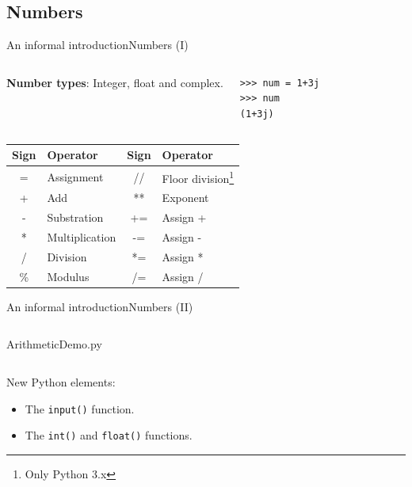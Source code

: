 \documentclass[10pt,compress]{beamer} %
\begin{document}
\subsection{Numbers}
\begin{frame}[fragile]{An informal introduction}{Numbers (I)}

\vspace{-0.2cm}
	\begin{columns}
	\textbf{Number types}: Integer, float and complex.

				\begin{block}{}
\begin{verbatim}
>>> num = 1+3j
>>> num
(1+3j)
\end{verbatim}
		\end{block}
		\end{columns}

    \vspace{-0.2cm}
	\begin{center}
	\bigskip
		\centering \begin{tabular}{cl|cl}\hline
		\sc Sign & \sc Operator 	& \sc Sign 	& \sc Operator \\ \hline
		= 	 & Assignment   & // 	& Floor division\footnote{Only Python 3.x}\\
		+ 	& Add  			& **	& Exponent \\
		- 	& Substration 	& +=	& Assign + \\
		* 	& Multiplication& -=	& Assign - \\
		/ 	& Division 		& *=	& Assign * \\
		\% 	& Modulus 		& /=	& Assign /\\\hline
		\end{tabular}
	\end{center}
\end{frame}

\begin{frame}[fragile]{An informal introduction}{Numbers (II)}
    \begin{columns}
		\begin{block}{ArithmeticDemo.py}
		
		\end{block}
	\end{columns}

	\bigskip
    New Python elements:
    \begin{itemize}
        \item The \texttt{input()} function.
		\item The \texttt{int()} and \texttt{float()} functions.
    \end{itemize}
\end{frame}
\end{document}
